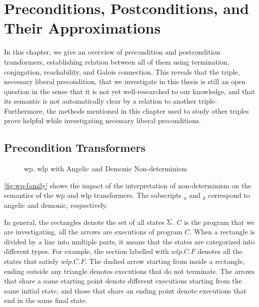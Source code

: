 \chapter{Preconditions, Postconditions, and Their Approximations}\label{ch:appr} %
In this chapter, we give an overview of precondition and postcondition transformers, establishing relation between all of them using termination, conjugation, reachability, and Galois connection. 
This reveals that the triple, necessary liberal precondition, that we investigate in this thesis is still an open question in the sense that it is not yet well-researched to our knowledge, and that its semantic is not automatically clear by a relation to another triple. 
Furthermore, the methods mentioned in this chapter used to study other triples prove helpful while investigating necessary liberal preconditions.   

\section{Precondition Transformers}
\begin{figure}[ht!]\centering
	\hfill

	\hfill
	\caption{wp, wlp with Angelic and Demonic Non-determinism}
	\label{fig:wp-family}
\end{figure}

\autoref{fig:wp-family} shows the impact of the interpretation of non-determinism on the semantics of the wp and wlp transformers. 
The subscripts $_a$ and $_d$ correspond to angelic and demonic, respectively. 

In general, the rectangles denote the set of all states $\S$. 
$C$ is the program that we are investigating, all the arrows are executions of program $C$. 
When a rectangle is divided by a line into multiple parts, it means that the states are categorized into different types. 
For example, the section  labelled with $wlp.C.F$ denotes all the states that satisfy $wlp.C.F$. 
The dashed arrow starting from inside a rectangle, ending outside any triangle denotes executions that do not terminate. 
The arrows that share a same starting point denote different executions starting from the same initial state, and those that share an ending point denote executions that end in the same final state. 

